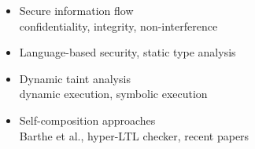 
\begin{itemize}

\item Secure information flow \\
confidentiality, integrity, non-interference

\item Language-based security, static type analysis 

\item Dynamic taint analysis\\
dynamic execution, symbolic execution 

\item Self-composition approaches\\
Barthe et al., hyper-LTL checker, recent papers

\end{itemize}




